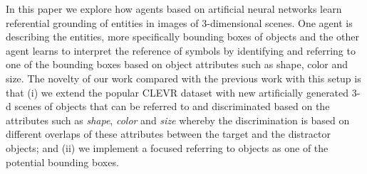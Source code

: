 \documentclass[11pt]{article}
\begin{document}
In this paper we explore how agents based on artificial neural networks learn referential grounding of entities in images of 3-dimensional scenes.
One agent is describing the entities, more specifically bounding boxes of objects and the other agent learns to interpret the reference of symbols by identifying and referring to one of the bounding boxes based on object attributes such as shape, color and size.
The novelty of our work compared with the previous work with this setup \citep{Kharitonov2019,Lazaridou2016} is that (i) we extend the popular CLEVR dataset \citep{Johnson2016} with new artificially generated 3-d scenes of objects that can be referred to and discriminated based on the attributes such as \emph{shape}, \emph{color} and \emph{size} whereby the discrimination is based on different overlaps of these attributes between the target and the distractor objects; and (ii) we implement a focused referring to objects as one of the potential bounding boxes.


\end{document}
